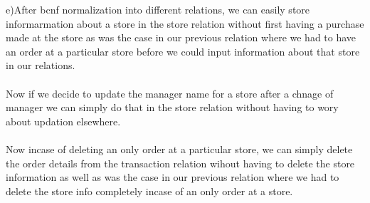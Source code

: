 \documentclass{article}
\begin{document}
\begin{enumerate}
	e)After bcnf normalization into different relations, we can easily store informarmation about a store in the store relation without first having a purchase made at the store
	  as was the case in our previous relation where we had to have an order at a particular store before we could input information about that store in our relations.
	  \\\\
	  Now if we decide to update the manager name for a store after a chnage of manager we can simply do that in the store relation without having to wory about updation elsewhere.
	  \\\\
	  Now incase of deleting an only order at a particular store, we can simply delete the order details from the transaction relation wihout having to delete the store information 
	  as well as was the case in our previous relation where we had to delete the store info completely incase of an only order at a store.
	  \\\\
	

\end{enumerate}
\end{document}
